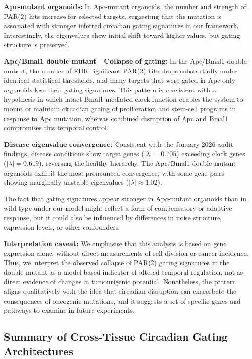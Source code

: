 \documentclass[11pt,a4paper]{article}
\begin{document}
\textbf{Apc-mutant organoids:} In Apc-mutant organoids, the number and strength of PAR(2) hits increase for selected targets, suggesting that the mutation is associated with stronger inferred circadian gating signatures in our framework. Interestingly, the eigenvalues show initial shift toward higher values, but gating structure is preserved.

\textbf{Apc/Bmal1 double mutant---Collapse of gating:} In the Apc/Bmal1 double mutant, the number of FDR-significant PAR(2) hits drops substantially under identical statistical thresholds, and many targets that were gated in Apc-only organoids lose their gating signatures. This pattern is consistent with a hypothesis in which intact Bmal1-mediated clock function enables the system to mount or maintain circadian gating of proliferation and stem-cell programs in response to Apc mutation, whereas combined disruption of Apc and Bmal1 compromises this temporal control.

\textbf{Disease eigenvalue convergence:} Consistent with the January 2026 audit findings, disease conditions show target genes ($|\lambda| = 0.705$) exceeding clock genes ($|\lambda| = 0.619$), reversing the healthy hierarchy. The Apc/Bmal1 double mutant organoids exhibit the most pronounced convergence, with some gene pairs showing marginally unstable eigenvalues ($|\lambda| \approx 1.02$).

The fact that gating signatures appear stronger in Apc-mutant organoids than in wild-type under our model might reflect a form of compensatory or adaptive response, but it could also be influenced by differences in noise structure, expression levels, or other confounders.

\textbf{Interpretation caveat:} We emphasise that this analysis is based on gene expression alone, without direct measurements of cell division or cancer incidence. Thus, we interpret the observed collapse of PAR(2) gating signatures in the double mutant as a model-based indicator of altered temporal regulation, not as direct evidence of changes in tumourigenic potential. Nonetheless, the pattern aligns qualitatively with the idea that circadian disruption can exacerbate the consequences of oncogenic mutations, and it suggests a set of specific genes and pathways to examine in future experiments.

\subsection{Summary of Cross-Tissue Circadian Gating Architectures}
\end{document}
